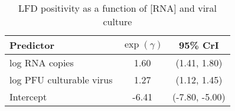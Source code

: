 \documentclass[11pt]{article}
\begin{document}
\begin{table}[p]
    \centering
    \caption{LFD positivity as a function of [RNA] and viral culture}
    \begin{tabular}{lcc}
     \toprule
     Predictor & $\exp(\gamma)$ & 95\% CrI\\
     \midrule
     log RNA copies & 1.60 & (1.41, 1.80)\\
     log PFU culturable virus & 1.27 & (1.12, 1.45)\\
     \midrule
     Intercept & -6.41 & (-7.80, -5.00)\\
     \bottomrule
     \end{tabular}
    \label{tab:lfd}
\end{table}
\end{document}
